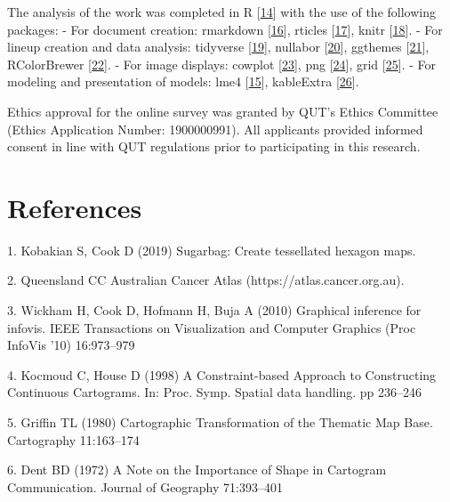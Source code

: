 \documentclass[conference,final,]{IEEEtran}
\begin{document}
The analysis of the work was completed in R {[}\protect\hyperlink{ref-RCore}{14}{]} with the use of the following packages:
- For document creation: rmarkdown {[}\protect\hyperlink{ref-rmarkdown}{16}{]}, rticles {[}\protect\hyperlink{ref-rticles}{17}{]}, knitr {[}\protect\hyperlink{ref-knitr}{18}{]}.
- For lineup creation and data analysis: tidyverse {[}\protect\hyperlink{ref-tidyverse}{19}{]}, nullabor {[}\protect\hyperlink{ref-nullabor}{20}{]}, ggthemes {[}\protect\hyperlink{ref-ggthemes}{21}{]}, RColorBrewer {[}\protect\hyperlink{ref-RColorBrewer}{22}{]}.
- For image displays: cowplot {[}\protect\hyperlink{ref-cowplot}{23}{]}, png {[}\protect\hyperlink{ref-png}{24}{]}, grid {[}\protect\hyperlink{ref-grid}{25}{]}.
- For modeling and presentation of models: lme4 {[}\protect\hyperlink{ref-lme4}{15}{]}, kableExtra {[}\protect\hyperlink{ref-kableExtra}{26}{]}.

Ethics approval for the online survey was granted by QUT's Ethics Committee (Ethics Application Number: 1900000991). All applicants provided informed consent in line with QUT regulations prior to participating in this research.

\newpage

\hypertarget{references}{%
\section{References}\label{references}}

\hypertarget{refs}{}
\leavevmode\hypertarget{ref-sugarbag}{}%
1. Kobakian S, Cook D (2019) Sugarbag: Create tessellated hexagon maps.

\leavevmode\hypertarget{ref-atlas}{}%
2. Queensland CC Australian Cancer Atlas (https://atlas.cancer.org.au).

\leavevmode\hypertarget{ref-GIIV}{}%
3. Wickham H, Cook D, Hofmann H, Buja A (2010) Graphical inference for infovis. IEEE Transactions on Visualization and Computer Graphics (Proc InfoVis '10) 16:973--979

\leavevmode\hypertarget{ref-CBATCC}{}%
4. Kocmoud C, House D (1998) A Constraint-based Approach to Constructing Continuous Cartograms. In: Proc. Symp. Spatial data handling. pp 236--246

\leavevmode\hypertarget{ref-CTTMB}{}%
5. Griffin TL (1980) Cartographic Transformation of the Thematic Map Base. Cartography 11:163--174

\leavevmode\hypertarget{ref-NISCC}{}%
6. Dent BD (1972) A Note on the Importance of Shape in Cartogram Communication. Journal of Geography 71:393--401
\end{document}
